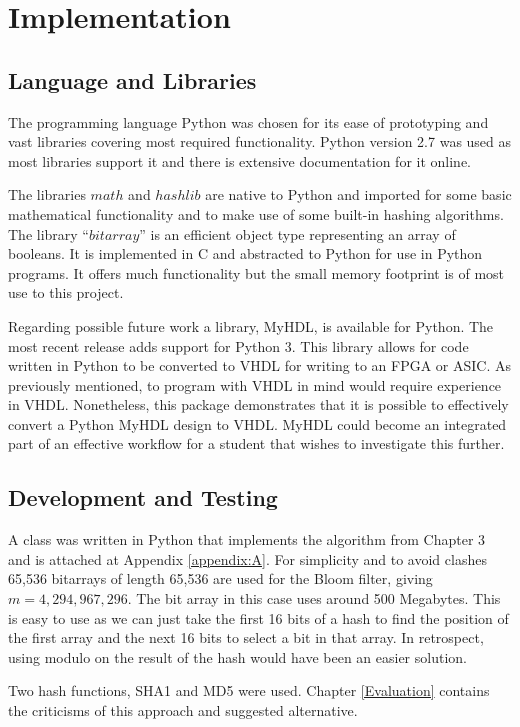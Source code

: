 \chapter{Implementation}

\section{Language and Libraries}
The programming language Python was chosen for its ease of prototyping and vast libraries covering most required functionality. Python version 2.7 was used as most libraries support it and there is extensive documentation for it online.

The libraries $math$ and $hashlib$ are native to Python and imported for some basic mathematical functionality and to make use of some built-in hashing algorithms. The library ``$bitarray$'' is an efficient object type representing an array of booleans. It is implemented in C and abstracted to Python for use in Python programs. \cite{bitarray} It offers much functionality but the small memory footprint is of most use to this project.

Regarding possible future work a library, MyHDL, is available for Python. The most recent release adds support for Python 3. This library allows for code written in Python to be converted to VHDL for writing to an FPGA or ASIC. \cite{myhdl} As previously mentioned, to program with VHDL in mind would require experience in VHDL. Nonetheless, this package demonstrates that it is possible to effectively convert a Python MyHDL design to VHDL. MyHDL could become an integrated part of an effective workflow for a student that wishes to investigate this further.

\section{Development and Testing}
A class was written in Python that implements the algorithm from Chapter 3 and is attached at Appendix \ref{appendix:A}. For simplicity and to avoid clashes 65,536 bitarrays of length 65,536 are used for the Bloom filter, giving $m = 4,294,967,296$. The bit array in this case uses around 500 Megabytes. This is easy to use as we can just take the first 16 bits of a hash to find the position of the first array and the next 16 bits to select a bit in that array. In retrospect, using modulo on the result of the hash would have been an easier solution.
 
Two hash functions, SHA1 and MD5 were used. Chapter \ref{Evaluation} contains the criticisms of this approach and suggested alternative.
